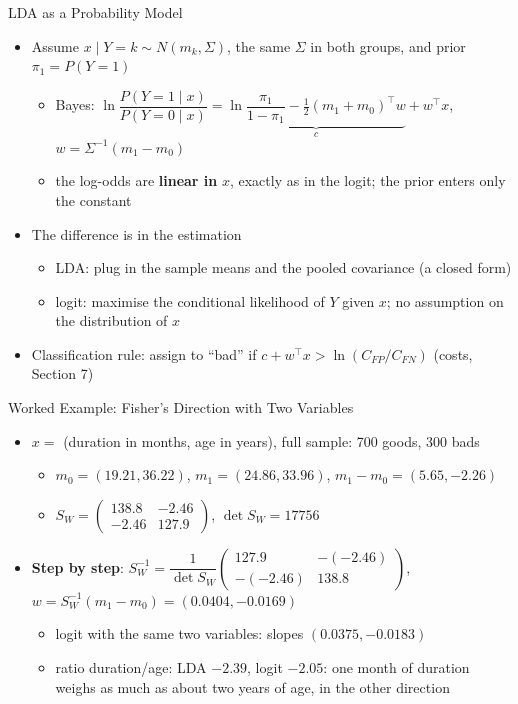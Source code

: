 \begin{frame}{LDA as a Probability Model}
\itemsize{\footnotesize}
\begin{itemize}
    \item Assume $x \mid Y = k \sim N(m_k, \Sigma)$, the same $\Sigma$ in both groups, and prior $\pi_1 = P(Y = 1)$
    \begin{itemize}
        \item Bayes: $\ln\dfrac{P(Y = 1 \mid x)}{P(Y = 0 \mid x)} = \underbrace{\ln\dfrac{\pi_1}{1 - \pi_1} - \tfrac12(m_1 + m_0)^\top w}_{c} + w^\top x$, \quad $w = \Sigma^{-1}(m_1 - m_0)$
        \item the log-odds are \textbf{linear in} $x$, exactly as in the logit; the prior enters only the constant
    \end{itemize}
    \item The difference is in the estimation
    \begin{itemize}
        \item LDA: plug in the sample means and the pooled covariance (a closed form)
        \item logit: maximise the conditional likelihood of $Y$ given $x$; no assumption on the distribution of $x$
    \end{itemize}
    \item Classification rule: assign to ``bad'' if $c + w^\top x > \ln(C_{FP}/C_{FN})$ (costs, Section 7)
\end{itemize}
\end{frame}

\begin{frame}{Worked Example: Fisher's Direction with Two Variables}
\itemsize{\footnotesize}
\begin{itemize}
    \item $x = $ (duration in months, age in years), full sample: 700 goods, 300 bads
    \begin{itemize}
        \item $m_0 = (19.21, 36.22)$, $m_1 = (24.86, 33.96)$, $m_1 - m_0 = (5.65, -2.26)$
        \item $S_W = \begin{pmatrix} 138.8 & -2.46 \\ -2.46 & 127.9 \end{pmatrix}$, $\det S_W = 17756$
    \end{itemize}
    \item \textbf{Step by step}: $S_W^{-1} = \dfrac{1}{\det S_W}\begin{pmatrix} 127.9 & -(-2.46) \\ -(-2.46) & 138.8 \end{pmatrix}$, $w = S_W^{-1}(m_1 - m_0) = (0.0404, -0.0169)$
    \begin{itemize}
        \item logit with the same two variables: slopes $(0.0375, -0.0183)$
        \item ratio duration/age: LDA $-2.39$, logit $-2.05$: one month of duration weighs as much as about two years of age, in the other direction
    \end{itemize}
\end{itemize}
\end{frame}

